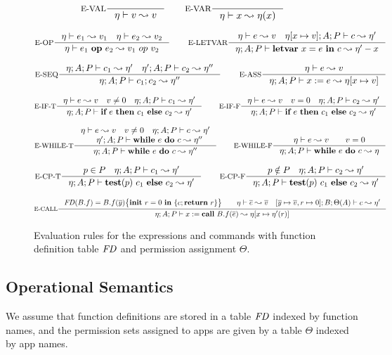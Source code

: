 \begin{figure*}[ht]
{\tiny
\[
\inference[E-VAL]{}{\eta \vdash \leVAL{v}  \leadsto v}
\qquad
\inference[E-VAR]{}{\eta \vdash \leVAR{x}  \leadsto \eta(x)}
\]

\[
\inference[E-OP]{\eta \vdash e_1 \leadsto v_1\quad \eta \vdash e_2 \leadsto v_2}
{\eta \vdash \leOP{e_1}{e_2} \leadsto v_1~op~v_2}
\qquad
\inference[E-LETVAR]{\eta \vdash e \leadsto v \quad \eta [ x \mapsto v ]; A ; P \vdash c \leadsto \eta'}
{\eta; A; P \vdash \lcLETVAR{x}{e}{c} \leadsto \eta' - x}
\]

\[
\inference[E-SEQ]{\eta;A; P \vdash c_1 \leadsto \eta' \quad \eta';A; P \vdash c_2 \leadsto \eta''}
{\eta;A;P \vdash \lcSEQ{c_1}{c_2} \leadsto \eta''}
\qquad
\inference[E-ASS]{\eta \vdash e \leadsto v}
{\eta; A; P \vdash \lcASS{x}{e} \leadsto \eta [ x \mapsto v ]}
\]

\[
\inference[E-IF-T]{\eta \vdash e \leadsto v\quad v\neq 0\quad \eta; A; P \vdash c_1 \leadsto \eta'}
{\eta; A; P \vdash \lcIF{e}{c_1}{c_2} \leadsto \eta'}
\qquad
\inference[E-IF-F]{\eta \vdash e \leadsto v\quad v = 0\quad \eta;A; P \vdash c_2 \leadsto \eta'}
{\eta;A; P \vdash \lcIF{e}{c_1}{c_2} \leadsto \eta'}
\]

\[
\inference[E-WHILE-T]{
\eta \vdash e \leadsto v\quad v\neq 0\quad
\eta;A; P \vdash c \leadsto \eta'\\
\quad \eta' ; A ; P \vdash \lcWHILE{e}{c} \leadsto \eta''
}
{\eta;A; P \vdash \lcWHILE{e}{c} \leadsto \eta''}
\qquad
\inference[E-WHILE-F]{\eta \vdash e \leadsto v\qquad v = 0}
{\eta;A; P \vdash \lcWHILE{e}{c} \leadsto \eta}
\]

\[
\inference[E-CP-T]{p\in P \quad \eta; A; P \vdash c_1 \leadsto \eta'}
{\eta; A ; P \vdash \lcCP{p}{c_1}{c_2} \leadsto \eta'}
\qquad
\inference[E-CP-F]{p\notin P \quad \eta;A;P \vdash c_2 \leadsto \eta'}
{\eta;A;P \vdash \lcCP{p}{c_1}{c_2} \leadsto \eta'}
\]

\[
\inference[E-CALL]{
\FD(B.f) = \lpPROG{B.f}{\overline{y}}{c}{\lpRES} \qquad
\eta\vdash\overline{e} \leadsto \overline{v} \quad
[\overline{y} \mapsto \overline{v}, r \mapsto 0] ; B; \Theta(A) \vdash c \leadsto \eta'}
{\eta;A;P \vdash \lcCALL{x}{B.f}{\overline{e}} \leadsto \eta[x \mapsto \eta'(r) ]}
\]
}
\caption{Evaluation rules for the expressions and commands with function definition table $\mathit{FD}$ and permission assignment $\Theta.$
}
\label{fig:semantics}
\end{figure*}
 
\subsection{Operational Semantics}\label{sec:semantics}
We assume that function definitions are stored in a table $\mathit{FD}$ indexed by function names, and the permission sets assigned to apps are given by a table $\Theta$ indexed by app names.

